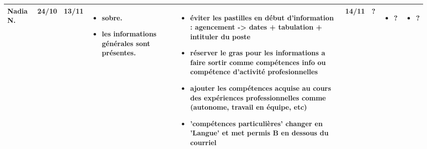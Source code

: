 \documentclass[a4paper,11pt]{article}
\begin{document}
\begin{landscape}
\begin{longtable}{|l|l|l|p{4cm}|p{4cm}|l|l|p{4cm}|p{4cm}|}
    Nadia N.  & 24/10 & 13/11 
	      & \begin{itemize}
		\item sobre.
		\item les informations générales sont présentes.
		\end{itemize}
	      & \begin{itemize}
		\item éviter les pastilles en début d'information : agencement -> dates + tabulation + intituler du poste
		\item réserver le gras pour les informations a faire sortir comme compétences info ou compétence d'activité profesionnelles
		\item ajouter les compétences acquise au cours des expériences professionnelles comme (autonome, travail en équipe, etc)
		\item 'compétences particulières' changer en 'Langue' et met permis B en dessous du courriel
		\end{itemize}
	      & 14/11 & ?
	      & \begin{itemize}
		\item ?
		\end{itemize}
	      & \begin{itemize}
		\item ?
		\end{itemize} \\ \hline


\end{longtable}
\end{landscape}
\end{document}
